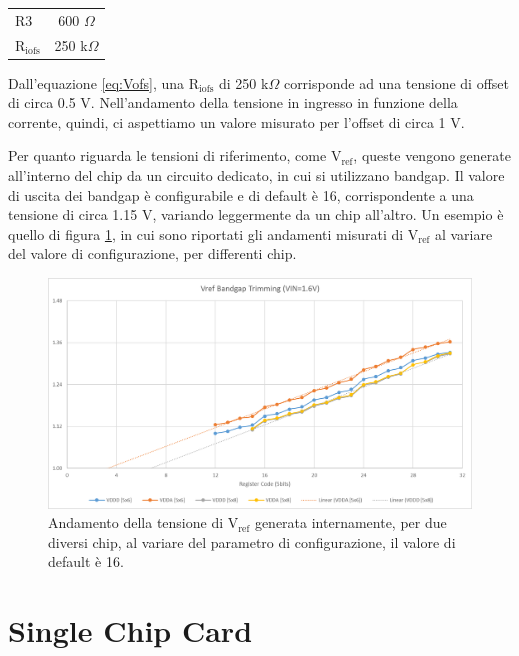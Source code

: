 \begin{center}
\begin{tabular}{lc}
\hline
$\mathrm{R3}$ & 600 $\Omega$ \\%
$\mathrm{R_{iofs}}$ & 250 k$\Omega$\\ 
\hline
\end{tabular}
\end{center}
Dall'equazione \ref{eq:Vofs}, una $\mathrm{R_{iofs}}$ di 250 k$\Omega$ corrisponde ad una tensione di offset di circa 0.5 V.
Nell'andamento della tensione in ingresso in funzione della corrente, quindi, ci aspettiamo un valore misurato per l'offset di circa 1 V.

Per quanto riguarda le tensioni di riferimento, come $\mathrm{V_{ref}}$, queste vengono generate all'interno del chip da un circuito dedicato, in cui si utilizzano bandgap.
Il valore di uscita dei bandgap è configurabile e di default è 16, corrispondente a una tensione di circa 1.15 V, variando leggermente da un chip all'altro.
Un esempio è quello di figura \ref{bandgap_trimming}, in cui sono riportati gli andamenti misurati di $\mathrm{V_{ref}}$ al variare del valore di configurazione, per differenti chip.

\begin{figure}
\centering
\includegraphics[scale=.5]{Immagini/bandgap_trimming}
\caption{Andamento della tensione di $\mathrm{V_{ref}}$ generata internamente, per due diversi chip, al variare del parametro di configurazione, il valore di default è 16.}
\label{bandgap_trimming}
\end{figure}

\section{Single Chip Card}

